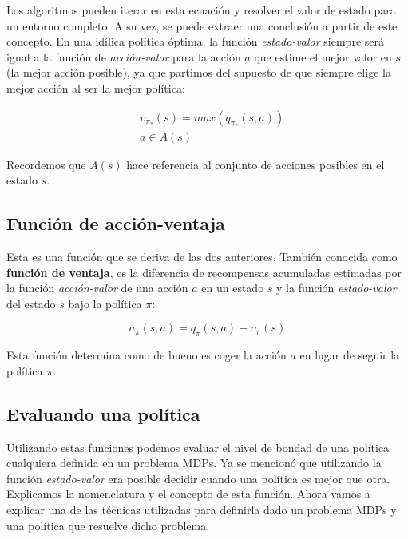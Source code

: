 \documentclass[11pt,fleqn]{book} %
\begin{document}
Los algoritmos pueden iterar en esta ecuación y resolver el valor de estado para un entorno completo. A su vez, se puede extraer una conclusión a partir de este concepto. En una idílica política óptima, la función \textit{estado-valor} siempre será igual a la función de \textit{acción-valor} para la acción $a$ que estime el mejor valor en $s$ (la mejor acción posible), ya que partimos del supuesto de que siempre elige la mejor acción al ser la mejor política:

\begin{align*}
&\upsilon_{\pi_*}(s) = max(q_{\pi_*}(s,a))\\
&a \in A(s)
\end{align*}

Recordemos que $A(s)$ hace referencia al conjunto de acciones posibles en el estado $s$. 


\subsection{Función de acción-ventaja}\label{sec:ventaja}

Esta es una función que se deriva de las dos anteriores. También conocida como \textbf{función de ventaja}, es la diferencia de recompensas acumuladas estimadas por la función \textit{acción-valor} de una acción $a$ en un estado $s$ y la función \textit{estado-valor} del estado $s$ bajo la política $\pi$:

\begin{equation*}
a_\pi(s,a)=q_\pi(s,a)-\upsilon_\pi(s)
\end{equation*}

Esta función determina como de bueno es coger la acción $a$ en lugar de seguir la política $\pi$.


\subsection{Evaluando una política}\label{sec:evaluacion}

Utilizando estas funciones podemos evaluar el nivel de bondad de una política cualquiera definida en un problema MDPs. Ya se mencionó que utilizando la función \textit{estado-valor} era posible decidir cuando una política es mejor que otra. \\

Explicamos la nomenclatura y el concepto de esta función. Ahora vamos a explicar una de las técnicas utilizadas para definirla dado un problema MDPs y una política que resuelve dicho problema.
\end{document}
